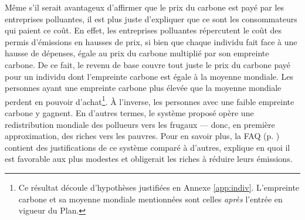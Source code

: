 \documentclass[a5paper,french,openany]{memoir}
\begin{document}
Même s'il serait avantageux %
d'affirmer que le prix du carbone est payé par les entreprises polluantes, il est plus juste d'expliquer que ce sont les consommateurs qui paient ce coût. 
En effet, les entreprises polluantes répercutent le coût des permis d'émissions en hausses de prix, si bien que chaque individu fait face à une hausse de dépenses, égale au prix du carbone multiplié par son empreinte carbone. De ce fait, le revenu de base couvre tout juste le prix du carbone payé pour un individu dont l'empreinte carbone est égale à la moyenne mondiale. Les personnes ayant une empreinte carbone plus élevée que la moyenne mondiale perdent en pouvoir d'achat\footnote{Ce résultat découle d'hypothèses justifiées en Annexe \ref{app:indiv}. L'empreinte carbone et sa moyenne mondiale mentionnées sont celles \textit{après} l'entrée en vigueur du Plan.
}. À l'inverse, les personnes avec une faible empreinte carbone y gagnent. En d'autres termes, le système proposé opère une redistribution mondiale des pollueurs vers les frugaux --- donc, en première approximation, des riches vers les pauvres. Pour en savoir plus, la FAQ (p. \pageref{q:riches}) contient des justifications de ce système comparé à d'autres, explique en quoi il est favorable aux plus modestes et obligerait les riches à réduire leurs émissions.
\end{document}
